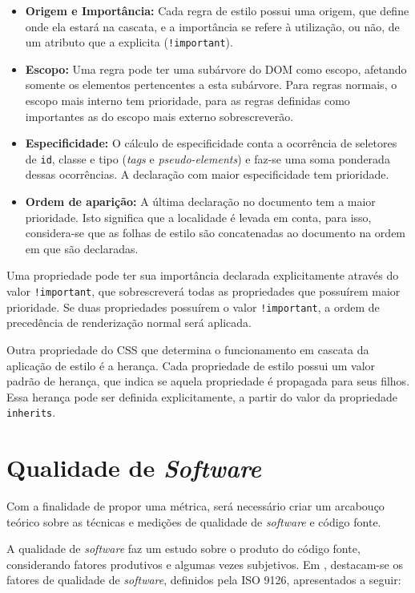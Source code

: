 \begin{itemize}
	\item \textbf{Origem e Importância:} 
	Cada regra de estilo possui uma origem, que define onde ela estará na cascata, e a importância se refere à utilização, ou não, de um atributo que a explicita (\texttt{!important}).
	\item \textbf{Escopo:}
	Uma regra pode ter uma subárvore do DOM como escopo, afetando somente os elementos pertencentes a esta subárvore. Para regras normais, o escopo mais interno tem prioridade, para as regras definidas como importantes as do escopo mais externo sobrescreverão.
	\item \textbf{Especificidade:}
	O cálculo de especificidade conta a ocorrência de seletores de \texttt{id}, classe e tipo (\textit{tags} e \textit{pseudo-elements}) e faz-se uma soma ponderada dessas ocorrências. A declaração com maior especificidade tem prioridade.
	\item \textbf{Ordem de aparição:}
	A última declaração no documento tem a maior prioridade. Isto significa que a localidade é levada em conta, para isso, considera-se que as folhas de estilo são concatenadas ao documento na ordem em que são declaradas.
\end{itemize}

Uma propriedade pode ter sua importância declarada explicitamente através do valor \texttt{!important}, que sobrescreverá todas as propriedades que possuírem maior prioridade. Se duas propriedades possuírem o valor \texttt{!important}, a ordem de precedência de renderização normal será aplicada.

Outra propriedade do CSS que determina o funcionamento em cascata da aplicação de estilo é a herança. Cada propriedade de estilo possui um valor padrão de herança, que indica se aquela propriedade é propagada para seus filhos. Essa herança pode ser definida explicitamente, a partir do valor da propriedade \texttt{inherits}. 

\section{Qualidade de \textit{Software}}

Com a finalidade de propor uma métrica, será necessário criar um arcabouço teórico sobre as técnicas e medições de qualidade de \textit{software} e código fonte.

A qualidade de \textit{software} faz um estudo sobre o produto do código fonte, considerando fatores produtivos e algumas vezes subjetivos. Em , destacam-se os fatores de qualidade de \textit{software}, definidos pela ISO 9126, apresentados a seguir:

